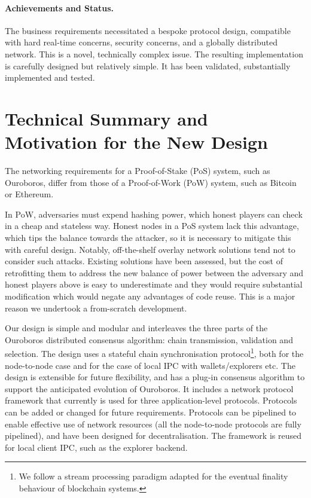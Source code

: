 \documentclass[11pt,a4paper]{article}
\begin{document}
\paragraph{Achievements and Status.}

The business requirements necessitated a bespoke protocol design,
compatible with hard real-time concerns, security concerns, and a
globally distributed network. This is a novel, technically complex
issue. The resulting implementation is carefully designed but relatively
simple. It has been validated, substantially implemented and tested.

\section{Technical Summary and Motivation for the New Design}
\label{technical-summary-and-motivation-for-the-new-design}

The networking requirements for a Proof-of-Stake (PoS) system, such as
Ouroboros, differ from those of a Proof-of-Work (PoW) system, such as
Bitcoin or Ethereum.

In PoW, adversaries must expend hashing power, which honest players can
check in a cheap and stateless way. Honest nodes in a PoS system lack
this advantage, which tips the balance towards the attacker, so it is
necessary to mitigate this with careful design. Notably, off-the-shelf
overlay network solutions tend not to consider such attacks. Existing
solutions have been assessed, but the cost of retrofitting them to
address the new balance of power between the adversary and honest
players above is easy to underestimate and they would require
substantial modification which would negate any advantages of code
reuse. This is a major reason we undertook a from-scratch development.

Our design is simple and modular and interleaves the three parts of the
Ouroboros distributed consensus algorithm: chain transmission,
validation and selection. The design uses a stateful chain
synchronisation protocol\footnote{We follow a stream processing paradigm
  adapted for the eventual finality behaviour of blockchain systems.},
both for the node-to-node case and for the case of local IPC with
wallets/explorers etc. The design is extensible for future flexibility,
and has a plug-in consensus algorithm to support the anticipated
evolution of Ouroboros. It includes a network protocol framework that
currently is used for three application-level protocols. Protocols can
be added or changed for future requirements. Protocols can be pipelined
to enable effective use of network resources (all the node-to-node
protocols are fully pipelined), and have been designed for
decentralisation. The framework is reused for local client IPC, such as
the explorer backend.
\end{document}
